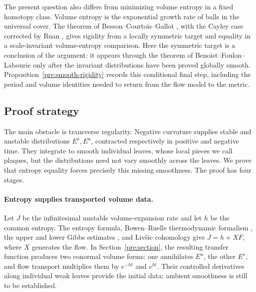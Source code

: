 \documentclass[11pt,a4paper]{article}
\theoremstyle{definition}
\theoremstyle{remark}
\numberwithin{equation}{section}
\begin{document}
The present question also differs from minimizing volume entropy in a
fixed homotopy class. Volume entropy is the exponential growth rate of
balls in the universal cover. The theorem of Besson--Courtois--Gallot
\citep{BessonCourtoisGallot1995}, with the Cayley case corrected by
Ruan \citep{Ruan2024}, gives rigidity from a locally symmetric target
and equality in a scale-invariant volume-entropy comparison. Here the
symmetric target is a conclusion of the argument: it appears through
the theorem of Benoist--Foulon--Labourie
\citep{BenoistFoulonLabourie1992} only after the invariant distributions
have been proved globally smooth. Proposition~\ref{pre:smooth-rigidity}
records this conditional final step, including the period and volume
identities needed to return from the flow model to the metric.

\subsection{Proof strategy}

The main obstacle is transverse regularity. Negative curvature supplies
stable and unstable distributions $E^s,E^u$, contracted respectively
in positive and negative time. They integrate to smooth individual
leaves, whose local pieces we call plaques, but the distributions need
not vary smoothly across the leaves. We prove that entropy equality
forces precisely this missing smoothness. The proof has four stages.

\paragraph{Entropy supplies transported volume data.}
Let $J$ be the infinitesimal unstable volume-expansion rate and let $h$
be the common entropy. The entropy formula, Bowen--Ruelle thermodynamic formalism
\citep{BowenRuelle1975}, the upper and lower Gibbs estimates
\citep[Theorem~3.1]{Climenhaga2024}, and Liv\v{s}ic cohomology
\citep{Livsic1972} give $J=h+XF$, where $X$ generates the flow.
In Section~\ref{pre:section}, the resulting transfer function produces
two conormal volume forms: one annihilates $E^u$, the other $E^s$,
and flow transport multiplies them by $e^{-ht}$ and $e^{ht}$.
Their controlled derivatives along individual weak leaves provide the
initial data; ambient smoothness is still to be established.
\end{document}

